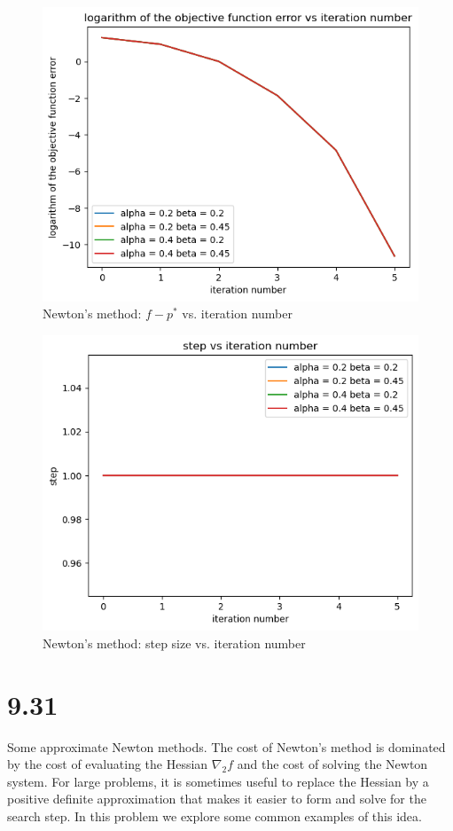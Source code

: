 \documentclass{article}
\begin{document}
\begin{figure}[H]
	\includegraphics[width=\linewidth]{9_30_b_obj_func.png}
	\caption{Newton's method: $f - p^*$ vs. iteration number}
\end{figure}

\begin{figure}[H]
	\includegraphics[width=\linewidth]{9_30_b_step.png}
	\caption{Newton's method: step size vs. iteration number}
\end{figure}


\section*{9.31}
Some approximate Newton methods. The cost of Newton’s method is dominated by the
cost of evaluating the Hessian $\nabla_2 f$ and the cost of solving the Newton system. For large
problems, it is sometimes useful to replace the Hessian by a positive definite approximation
that makes it easier to form and solve for the search step. In this problem we explore
some common examples of this idea.
\end{document}
